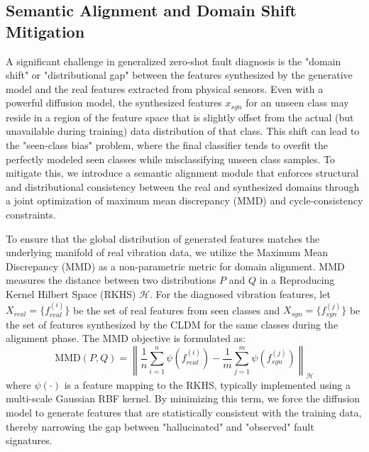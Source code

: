 \subsection{Semantic Alignment and Domain Shift Mitigation}
\label{sec:alignment}
A significant challenge in generalized zero-shot fault diagnosis is the "domain shift" or "distributional gap" between the features synthesized by the generative model and the real features extracted from physical sensors. Even with a powerful diffusion model, the synthesized features $x_{syn}$ for an unseen class may reside in a region of the feature space that is slightly offset from the actual (but unavailable during training) data distribution of that class. This shift can lead to the "seen-class bias" problem, where the final classifier tends to overfit the perfectly modeled seen classes while misclassifying unseen class samples. To mitigate this, we introduce a semantic alignment module that enforces structural and distributional consistency between the real and synthesized domains through a joint optimization of maximum mean discrepancy (MMD) and cycle-consistency constraints.

To ensure that the global distribution of generated features matches the underlying manifold of real vibration data, we utilize the Maximum Mean Discrepancy (MMD) as a non-parametric metric for domain alignment. MMD measures the distance between two distributions $P$ and $Q$ in a Reproducing Kernel Hilbert Space (RKHS) $\mathcal{H}$. For the diagnosed vibration features, let $X_{real} = \{f_{real}^{(i)}\}$ be the set of real features from seen classes and $X_{syn} = \{f_{syn}^{(j)}\}$ be the set of features synthesized by the CLDM for the same classes during the alignment phase. The MMD objective is formulated as:
\begin{equation}
\text{MMD}(P, Q) = \left\| \frac{1}{n} \sum_{i=1}^n \psi(f_{real}^{(i)}) - \frac{1}{m} \sum_{j=1}^m \psi(f_{syn}^{(j)}) \right\|_{\mathcal{H}}
\end{equation}
where $\psi(\cdot)$ is a feature mapping to the RKHS, typically implemented using a multi-scale Gaussian RBF kernel. By minimizing this term, we force the diffusion model to generate features that are statistically consistent with the training data, thereby narrowing the gap between "hallucinated" and "observed" fault signatures.

